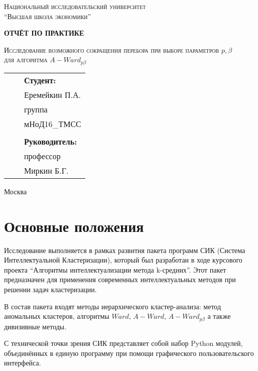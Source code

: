 \documentclass[12pt,twoside,a4paper,tikz,border=5]{refart}
\begin{document}
	\begin{titlepage}
		\centering
		{\scshape\small Национальный исследовательский университет \\
			``Высшая школа экономики'' \par}
		\vspace{2cm}
		{\Huge\bfseries ОТЧЁТ ПО ПРАКТИКЕ\par}
		\vspace{2cm}
		{\scshape\Large Исследование возможного сокращения перебора при выборе параметров $ p, \beta $ \\
			для алгоритма $ A-Ward_{p\beta}$ \par}
		\vspace{1.5cm}
				
		\vfill
		\begin{center}
			\begin{tabular}{  p{7cm}  p{4cm} p{5cm}  } 
				& & \textbf{Студент:}\\ 
				& & Еремейкин П.А. \\ 
				& & группа \\
				& & мНоД16\_ТМСС\\
				& & \\
				& & \textbf{Руководитель: }\\
				& & профессор\\
				& & Миркин Б.Г.\\
			\end{tabular}
		\end{center}
		\vfill
		{Москва \the\year\par}
	\end{titlepage}


	\tableofcontents 
	\newpage
	\section{Основные положения}
	
		Исследование выполняется в рамках развития пакета программ СИК (Система Интеллектуальной Кластеризации), который был разработан в ходе курсового проекта ``Алгоритмы интеллектуализации метода k-средних''. Этот пакет предназначен для применения современных интеллектуальных методов при решении задач кластеризации. 
		
		В состав пакета входят методы иерархического кластер-анализа: метод аномальных кластеров, алгоритмы $ Ward $, $ A-Ward $, $ A-Ward_{p\beta} $ а также дивизивные методы. 
		
		С технической точки зрения СИК представляет собой набор Python модулей, объединённых в единую программу при помощи графического пользовательского интерфейса.  
		
\end{document}
